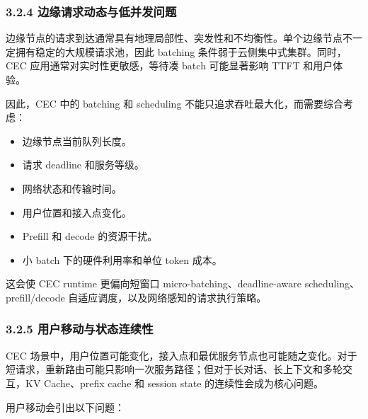 \documentclass[a4paper,twocolumn,10pt]{ctexart}
\begin{document}
\subsubsection{3.2.4 边缘请求动态与低并发问题}



边缘节点的请求到达通常具有地理局部性、突发性和不均衡性。单个边缘节点不一定拥有稳定的大规模请求池，因此 batching 条件弱于云侧集中式集群。同时，CEC 应用通常对实时性更敏感，等待凑 batch 可能显著影响 TTFT 和用户体验。




因此，CEC 中的 batching 和 scheduling 不能只追求吞吐最大化，而需要综合考虑：




\begin{itemize}
\item 边缘节点当前队列长度。

\item 请求 deadline 和服务等级。

\item 网络状态和传输时间。

\item 用户位置和接入点变化。

\item Prefill 和 decode 的资源干扰。

\item 小 batch 下的硬件利用率和单位 token 成本。



\end{itemize}
这会使 CEC runtime 更偏向短窗口 micro-batching、deadline-aware scheduling、prefill/decode 自适应调度，以及网络感知的请求执行策略。








\subsubsection{3.2.5 用户移动与状态连续性}



CEC 场景中，用户位置可能变化，接入点和最优服务节点也可能随之变化。对于短请求，重新路由可能只影响一次服务路径；但对于长对话、长上下文和多轮交互，KV Cache、prefix cache 和 session state 的连续性会成为核心问题。




用户移动会引出以下问题：
\end{document}

